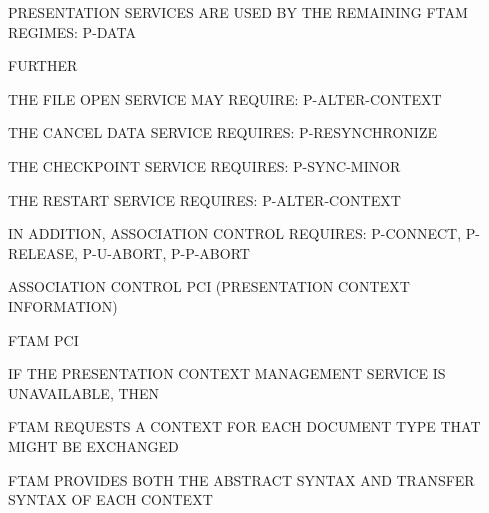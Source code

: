 \begin{bwslide}

\begin{nrtc}
\item	PRESENTATION SERVICES ARE USED BY THE REMAINING FTAM REGIMES: P-DATA

\item	FURTHER
    \begin{nrtc}
    \item	THE FILE OPEN SERVICE MAY REQUIRE: P-ALTER-CONTEXT

    \item	THE CANCEL DATA SERVICE REQUIRES: P-RESYNCHRONIZE

    \item	THE CHECKPOINT SERVICE REQUIRES: P-SYNC-MINOR

    \item	THE RESTART SERVICE REQUIRES: P-ALTER-CONTEXT
    \end{nrtc}

\item	IN ADDITION, ASSOCIATION CONTROL REQUIRES:
	P-CONNECT, P-RELEASE, P-U-ABORT, P-P-ABORT
\end{nrtc}
\end{bwslide}


\begin{bwslide}

\begin{nrtc}
\item	ASSOCIATION CONTROL PCI (PRESENTATION CONTEXT INFORMATION)

\item	FTAM PCI

\item	IF THE PRESENTATION CONTEXT MANAGEMENT SERVICE IS UNAVAILABLE, THEN
    \begin{nrtc}
    \item	FTAM REQUESTS A CONTEXT FOR EACH DOCUMENT TYPE THAT MIGHT BE
		EXCHANGED
    \end{nrtc}

\item	FTAM PROVIDES BOTH THE ABSTRACT SYNTAX AND TRANSFER SYNTAX
	OF EACH CONTEXT
\end{nrtc}
\end{bwslide}


